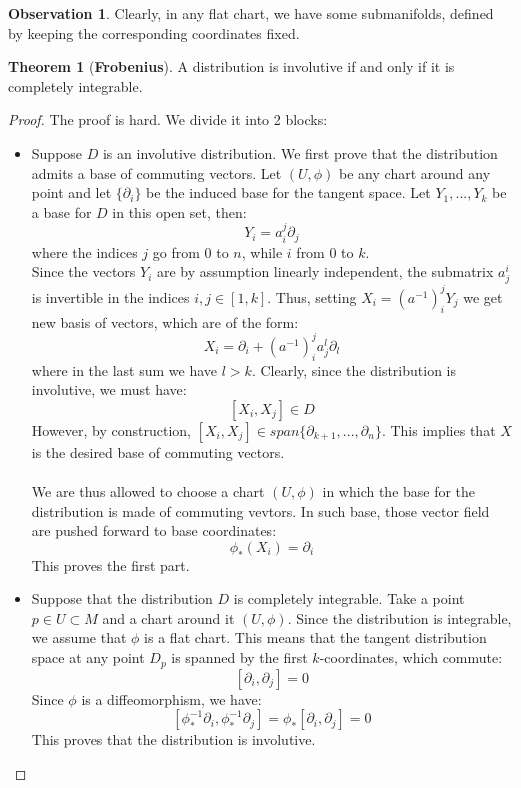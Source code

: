 \documentclass[12pt,a4paper]{report}
\theoremstyle{definition}
\theoremstyle{Theorem}
\newtheorem{Theo}[Def]{Theorem}
\theoremstyle{break}
\theoremstyle{definition}
\newtheorem{Obs}[Def]{Observation}
\begin{document}
 		\begin{Obs}
 			Clearly, in any flat chart, we have some submanifolds, defined by keeping the corresponding coordinates fixed.
 		\end{Obs}
 		\begin{Theo}[\textbf{Frobenius}]
 			A distribution is involutive if and only if it is completely integrable.
 		\end{Theo}
 		\begin{proof}
 			The proof is hard. We divide it into 2 blocks:
 			\begin{itemize}
 				\item Suppose $D$ is an involutive distribution. We first prove that the distribution admits a base of commuting vectors. Let $(U,\phi)$ be any chart around any point and let $\{\partial_i\}$ be the induced base for the tangent space. Let $Y_1,...,Y_k$ be a base for $D$ in this open set, then:
 				$$Y_i=a^j_i\partial_j$$
 				where the indices $j$ go from $0$ to $n$, while $i$ from $0$ to $k$.\\
 				Since the vectors $Y_i$ are by assumption linearly independent, the submatrix $a^i_j$ is invertible in the indices $i,j\in[1,k]$. Thus, setting $X_i=(a^{-1})^j_i Y_j$ we get new basis of vectors, which are of the form:
 				$$X_i=\partial_i+(a^{-1})^j_i a^l_j \partial_l$$
 				where in the last sum we have $l>k$.
 				Clearly, since the distribution is involutive, we must have:
 				$$[X_i,X_j]\in D$$
 				However, by construction, $[X_i,X_j]\in span\{\partial_{k+1},...,\partial_n\}$. This implies that $X$ is the desired base of commuting vectors.\\
 				\\
 				We are thus allowed to choose a chart $(U,\phi)$ in which the base for the distribution is made of commuting vevtors. In such base, those vector field are pushed forward to base coordinates:
 				$$\phi_*(X_i)=\partial_i$$
 				This proves the first part.
 				\item Suppose that the distribution $D$ is completely integrable. Take a point $p\in U\subset M$ and a chart around it $(U,\phi)$. Since the distribution is integrable, we assume that $\phi$ is a flat chart. This means that the tangent distribution space at any point $D_p$ is spanned by the first $k$-coordinates, which commute:
 				$$[\partial_i,\partial_j]=0$$
 				Since $\phi$ is a diffeomorphism, we have:
 				$$[\phi^{-1}_*\partial_i,\phi^{-1}_*\partial_j]=\phi_*[\partial_i,\partial_j]=0$$
 				This proves that the distribution is involutive.
 			\end{itemize}
 		\end{proof}
\end{document}
